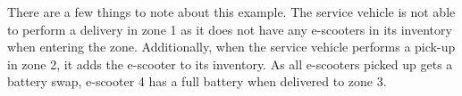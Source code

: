 There are a few things to note about this example. The service vehicle is not able to perform a delivery in zone 1 as it does not have any e-scooters in its inventory when entering the zone. Additionally, when the service vehicle performs a pick-up in zone 2, it adds the e-scooter to its inventory. As all e-scooters picked up gets a battery swap, e-scooter 4 has a full battery when delivered to zone 3.

\begin{figure}[H]
    \centering
    \begin{subfigure}[H] {0.47\textwidth}
\end{subfigure}
\end{figure}
